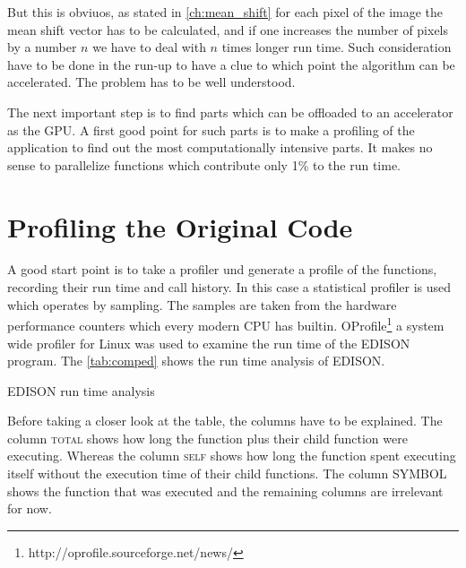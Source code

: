 But this is obviuos, as stated in \autoref{ch:mean_shift} for each pixel of the
image the mean shift vector has to be calculated, and if one increases the number
of pixels by a number $n$ we have to deal with $n$ times longer run time. Such 
consideration have to be done in the run-up to have a clue to which point the 
algorithm can be accelerated. The problem has to be well understood. 

The next important step is to find parts which can be offloaded to an accelerator
as the \gls{GPU}. A first good point for such parts is to make a profiling of 
the application to find out the most computationally intensive parts. It makes no
sense to parallelize functions which contribute only 1\% to the run time. 

\section{Profiling the Original Code} %
\label{sec:run_time_analysis_of_the_original_code}
A good start point is to take a profiler und generate a profile of the
functions, recording their run time and call history. In this case a statistical
profiler is used which operates by sampling. The samples are taken from the
hardware performance counters which every modern \gls{CPU} has builtin.
OProfile\footnote{http://oprofile.sourceforge.net/news/} a system wide profiler
for Linux was used to examine the run time of the \gls{EDISON} program. The
\autoref{tab:comped} shows the run time analysis of \gls{EDISON}.

\begin{table}[ht]
	\centering
  	\caption[EDISON run time profile]{ \gls{EDISON} run time analysis}
  	\label{tab:comped}
\end{table}

Before taking a closer look at the table, the columns have to be explained. The
column {\textsc{total}} shows how long the function plus their child function
were executing. Whereas the column {\textsc{self}} shows how long the function spent
executing itself without the execution time of their child functions. The
column {\textsc{SYMBOL}} shows the function that was executed and the remaining
columns are irrelevant for now.

